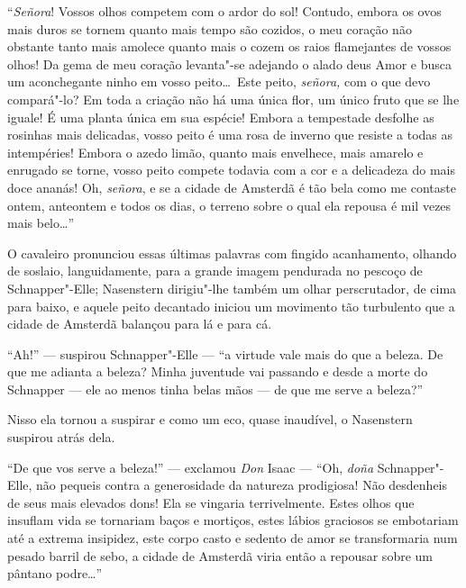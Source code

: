 ``\textit{Señora}! Vossos olhos competem com o ardor do sol! Contudo,
embora os ovos mais duros se tornem quanto mais tempo são cozidos, o
meu coração não obstante tanto mais amolece quanto mais o cozem os
raios flamejantes de vossos olhos! Da gema de meu coração levanta"-se
adejando o alado deus Amor e busca um aconchegante ninho em vosso
peito\ldots\ Este peito, \textit{señora,} com o que devo compará"-lo? Em
toda a criação não há uma única flor, um único fruto que se lhe iguale!
É uma planta única em sua espécie! Embora a tempestade desfolhe as
rosinhas mais delicadas, vosso peito é uma rosa de inverno que resiste
a todas as intempéries! Embora o azedo limão, quanto mais envelhece,
mais amarelo e enrugado se torne, vosso peito compete todavia com a cor
e a delicadeza do mais doce ananás! Oh, \textit{señora}, e se a cidade
de Amsterdã é tão bela como me contaste ontem, anteontem e todos os
dias, o terreno sobre o qual ela repousa é mil vezes mais belo\ldots''

O cavaleiro pronunciou essas últimas palavras com fingido acanhamento,
olhando de soslaio, languidamente, para a grande imagem pendurada no
pescoço de Schnapper"-Elle; Nasenstern dirigiu"-lhe também um olhar
perscrutador, de cima para baixo, e aquele peito decantado iniciou um
movimento tão turbulento que a cidade de Amsterdã balançou para lá e
para cá.

``Ah!'' --- suspirou Schnapper"-Elle --- ``a virtude vale mais do que a
beleza. De que me adianta a beleza? Minha juventude vai passando e
desde a morte do Schnapper --- ele ao menos tinha belas mãos --- de que me
serve a beleza?''

Nisso ela tornou a suspirar e como um eco, quase inaudível, o Nasenstern
suspirou atrás dela.

``De que vos serve a beleza!'' --- exclamou \textit{Don} Isaac --- ``Oh,
\textit{doña} Schnapper"-Elle, não pequeis contra a generosidade da
natureza prodigiosa! Não desdenheis de seus mais elevados dons! Ela se
vingaria terrivelmente. Estes olhos que insuflam vida se tornariam
baços e mortiços, estes lábios graciosos se embotariam até a extrema
insipidez, este corpo casto e sedento de amor se transformaria num
pesado barril de sebo, a cidade de Amsterdã viria então a repousar
sobre um pântano podre\ldots''

